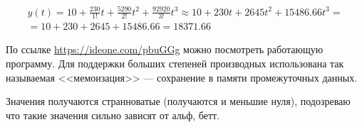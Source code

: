 \documentclass[11pt,reqno]{amsart}
\begin{document}
\begin{equation}
\begin{gathered}
y(t) = 10 + \frac {230}{1!}t + \frac {5290} {2!} t^2 + \frac {92920} {3!}t^3 \approx 10+230t + 2645 t^2 + 15486.66t^3 = \\
= 10 + 230 + 2645 + 15486.66 = 18371.66
\end{gathered}
\end{equation}

По ссылке \url{https://ideone.com/pbuGGg} можно посмотреть работающую программу. Для поддержки больших степеней производных использована так называемая <<мемоизация>> --- сохранение в памяти промежуточных данных.

Значения получаются странноватые (получаются и меньшие нуля), подозреваю что такие значения сильно зависят от альф, бетт.
\end{document}
